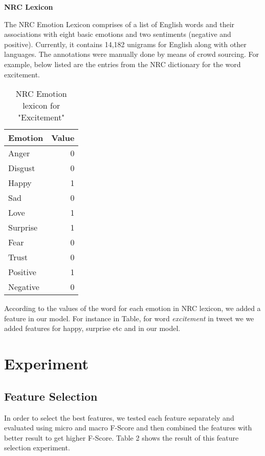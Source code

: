 \documentclass[11pt]{article}
\begin{document}
  {\bf NRC Lexicon}
  
  The NRC Emotion Lexicon comprises of a list of English words and their associations with eight basic emotions and two sentiments (negative and
  positive). Currently, it contains 14,182 unigrams for English along with other languages. The annotations were manually done by means of crowd sourcing. For example, below listed are the entries from the NRC dictionary for the word excitement.\\
  
  \begin{table}[h]
  \begin{center}
  \begin{tabular}{|l|r|}
  \hline \bf Emotion & \bf Value\\ \hline
  Anger & 0\\
  Disgust & 0\\
  Happy & 1\\
  Sad & 0\\
  Love & 1\\
  Surprise & 1\\
  Fear & 0\\
  Trust & 0\\
  Positive & 1\\
  Negative & 0\\
  \hline
  \end{tabular}
  \end{center}
  \caption{\label{font-table} NRC Emotion lexicon for "Excitement"}
  \end{table}
  
  According to the values of the word for each emotion in NRC lexicon, we added a feature in our model. For instance in Table, for word \emph{excitement} in tweet we
  we added features for happy, surprise etc and in our model.
  
  \section{Experiment}
  
  \subsection{Feature Selection}
  
  In order to select the best features, we tested each feature separately and evaluated using micro and macro F-Score and then combined the features
  with better result to get higher F-Score. Table 2 shows the result of this feature selection experiment.
  
\end{document}
